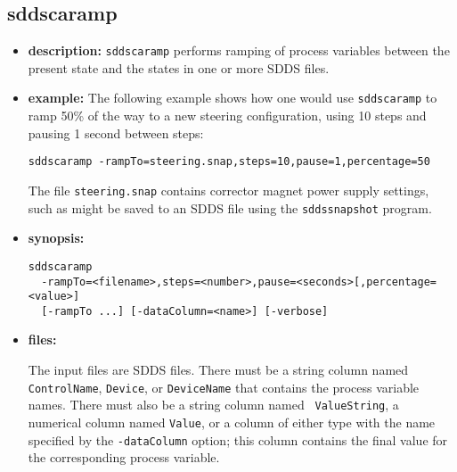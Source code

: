 %
%
\begin{latexonly}
\newpage
\end{latexonly}

%
%
\subsection{sddscaramp}
\label{sddscaramp}

\begin{itemize}
\item {\bf description:}
%
%
\verb+sddscaramp+ performs ramping of process variables between
the present state and the states in one or more SDDS files.

\item {\bf example:} 
%
% 
%
The following example shows how one would use \verb+sddscaramp+ to
ramp 50\% of the way to a new steering configuration, using 10
steps and pausing 1 second between steps: 
\begin{verbatim}
sddscaramp -rampTo=steering.snap,steps=10,pause=1,percentage=50
\end{verbatim}
The file \verb+steering.snap+ contains corrector magnet power supply
settings, such as might be saved to an SDDS file using the
\verb+sddssnapshot+ program.
\item {\bf synopsis:} 
%
%
\begin{verbatim}
sddscaramp 
  -rampTo=<filename>,steps=<number>,pause=<seconds>[,percentage=<value>]
  [-rampTo ...] [-dataColumn=<name>] [-verbose]
\end{verbatim}
\item {\bf files:}

The input files are SDDS files.  There must be a string column named
{\tt ControlName}, {\tt Device}, or {\tt DeviceName} that contains the
process variable names.  There must also be a string column named {\tt
ValueString}, a numerical column named {\tt Value}, or a column of
either type with the name specified by the \verb+-dataColumn+ option;
this column contains the final value for the corresponding process
variable.  


\end{itemize}
